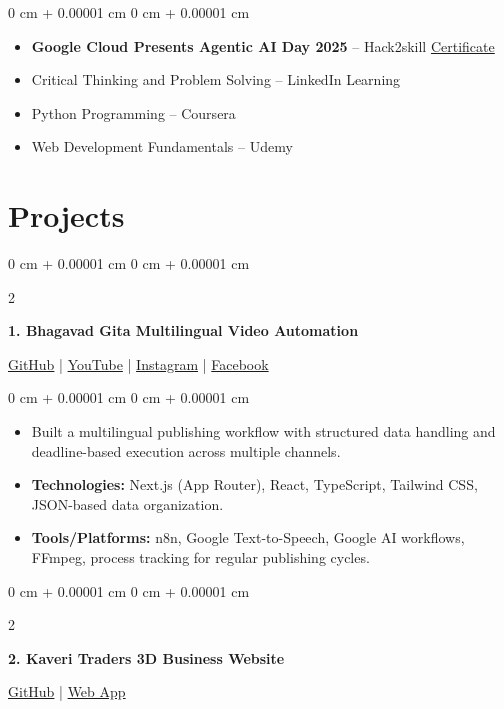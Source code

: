\documentclass[10pt, a4paper]{article}
\newenvironment{highlights}{
    \begin{itemize}[
        topsep=0.06 cm,
        parsep=0.04 cm,
        partopsep=0pt,
        itemsep=0.02 cm,
        leftmargin=0 cm + 10pt
    ]
}{
    \end{itemize}
}
\newenvironment{onecolentry}{
    \begin{adjustwidth}{
        0 cm + 0.00001 cm
    }{
        0 cm + 0.00001 cm
    }
}{
    \end{adjustwidth}
}
\newenvironment{twocolentry}[2][4.5 cm]{
    \onecolentry
    \def\secondColumn{#2}
    \setcolumnwidth{\fill, #1}
    \begin{paracol}{2}
}{
    \switchcolumn \raggedleft \secondColumn
    \end{paracol}
    \endonecolentry
}
\begin{document}
    \begin{onecolentry}
        \begin{highlights}
            \item \textbf{Google Cloud Presents Agentic AI Day 2025} – Hack2skill \hfill \href{https://certificate.hack2skill.com/user/aidayideasubmission/2025H2S06AID-I11874}{Certificate}
            \item Critical Thinking and Problem Solving – LinkedIn Learning
            \item Python Programming – Coursera
            \item Web Development Fundamentals – Udemy
        \end{highlights}
    \end{onecolentry}

    \section{Projects}

    \begin{twocolentry}[5.8 cm]{
        \small{\href{https://github.com/nrenx/Bhagavad-gita}{GitHub} | \href{https://www.youtube.com/@Gita_Gyanaam/playlists}{YouTube} | \href{https://www.instagram.com/gita_gyanaam/}{Instagram} | \href{https://www.facebook.com/profile.php?id=61577900636828}{Facebook}}
    }
        \textbf{1. Bhagavad Gita Multilingual Video Automation}
    \end{twocolentry}

    \vspace{0.2 cm}
    \begin{onecolentry}
        \begin{highlights}
            \item Built a multilingual publishing workflow with structured data handling and deadline-based execution across multiple channels.
            \item \textbf{Technologies:} Next.js (App Router), React, TypeScript, Tailwind CSS, JSON-based data organization.
            \item \textbf{Tools/Platforms:} n8n, Google Text-to-Speech, Google AI workflows, FFmpeg, process tracking for regular publishing cycles.
        \end{highlights}
    \end{onecolentry}

    \vspace{0.2 cm}

    \begin{twocolentry}{
        \href{https://github.com/nrenx/kaveri_traders}{GitHub} | \href{https://nrenx.github.io/kaveri_traders/}{Web App}
    }
        \textbf{2. Kaveri Traders 3D Business Website}
    \end{twocolentry}
\end{document}

